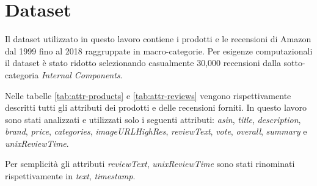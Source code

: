 \section{Dataset}
Il dataset \cite{ni2019justifying} utilizzato in questo lavoro contiene i prodotti e le recensioni di Amazon dal 1999 fino al 2018 raggruppate
in macro-categorie.
Per esigenze computazionali il dataset è stato ridotto selezionando casualmente 30,000 recensioni dalla sotto-categoria \textit{Internal Components}.

Nelle tabelle \ref{tab:attr-products} e \ref{tab:attr-reviews} vengono rispettivamente descritti tutti gli attributi dei prodotti e delle recensioni forniti. In questo lavoro sono stati analizzati e utilizzati solo i seguenti attributi: \textit{asin}, \textit{title}, \textit{description}, \textit{brand}, \textit{price}, \textit{categories}, \textit{imageURLHighRes}, \textit{reviewText}, \textit{vote}, \textit{overall}, \textit{summary} e \textit{unixReviewTime}.

Per semplicità gli attributi \textit{reviewText}, \textit{unixReviewTime} sono stati rinominati rispettivamente in \textit{text}, \textit{timestamp}.

